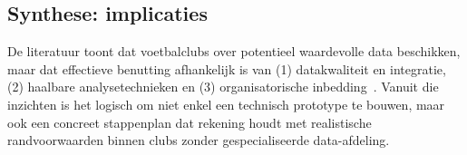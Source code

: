 \subsection{Synthese: implicaties}

De literatuur toont dat voetbalclubs over potentieel waardevolle data beschikken, maar dat effectieve benutting afhankelijk is van (1) datakwaliteit en integratie, (2) haalbare analysetechnieken en (3) organisatorische inbedding~\autocite{Alamar2013}.
Vanuit die inzichten is het logisch om niet enkel een technisch prototype te bouwen, maar ook een concreet stappenplan dat rekening houdt met realistische randvoorwaarden binnen clubs zonder gespecialiseerde data-afdeling.






